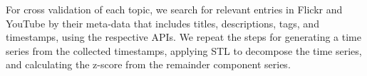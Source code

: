 For cross validation of each topic, we search for relevant entries in Flickr and YouTube by their meta-data 
that includes titles, descriptions, tags, and timestamps, using the respective APIs.
We repeat the steps for generating a time series from the collected timestamps, applying STL to decompose the time series,
and calculating the z-score from the remainder component series.



%
%
%